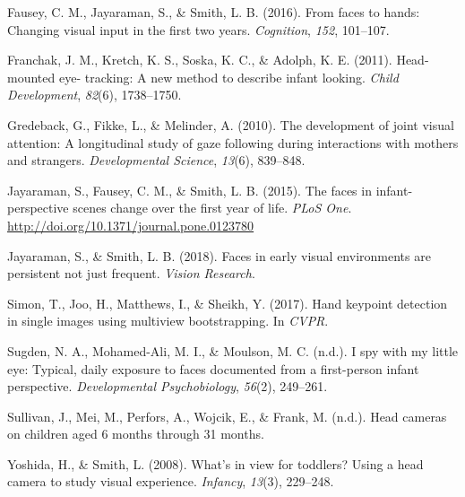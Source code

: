 \documentclass[10pt, letterpaper]{article}
\begin{document}
\leavevmode\hypertarget{ref-Fausey2016}{}%
Fausey, C. M., Jayaraman, S., \& Smith, L. B. (2016). From faces to
hands: Changing visual input in the first two years. \emph{Cognition},
\emph{152}, 101--107.

\leavevmode\hypertarget{ref-Franchak2011}{}%
Franchak, J. M., Kretch, K. S., Soska, K. C., \& Adolph, K. E. (2011).
Head-mounted eye- tracking: A new method to describe infant looking.
\emph{Child Development}, \emph{82}(6), 1738--1750.

\leavevmode\hypertarget{ref-Gredeback2010}{}%
Gredeback, G., Fikke, L., \& Melinder, A. (2010). The development of
joint visual attention: A longitudinal study of gaze following during
interactions with mothers and strangers. \emph{Developmental Science},
\emph{13}(6), 839--848.

\leavevmode\hypertarget{ref-Jayaraman2015}{}%
Jayaraman, S., Fausey, C. M., \& Smith, L. B. (2015). The faces in
infant-perspective scenes change over the first year of life. \emph{PLoS
One}. \url{http://doi.org/10.1371/journal.pone.0123780}

\leavevmode\hypertarget{ref-Jayaraman2018}{}%
Jayaraman, S., \& Smith, L. B. (2018). Faces in early visual
environments are persistent not just frequent. \emph{Vision Research}.

\leavevmode\hypertarget{ref-Simon2017hand}{}%
Simon, T., Joo, H., Matthews, I., \& Sheikh, Y. (2017). Hand keypoint
detection in single images using multiview bootstrapping. In
\emph{CVPR}.

\leavevmode\hypertarget{ref-Sugden2014}{}%
Sugden, N. A., Mohamed-Ali, M. I., \& Moulson, M. C. (n.d.). I spy with
my little eye: Typical, daily exposure to faces documented from a
first-person infant perspective. \emph{Developmental Psychobiology},
\emph{56}(2), 249--261.

\leavevmode\hypertarget{ref-SAYcam}{}%
Sullivan, J., Mei, M., Perfors, A., Wojcik, E., \& Frank, M. (n.d.).
Head cameras on children aged 6 months through 31 months.

\leavevmode\hypertarget{ref-Yoshida2008}{}%
Yoshida, H., \& Smith, L. (2008). What's in view for toddlers? Using a
head camera to study visual experience. \emph{Infancy}, \emph{13}(3),
229--248.


\end{document}

